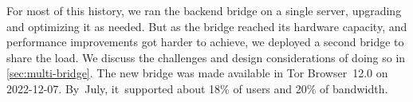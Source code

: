 \documentclass[letterpaper,twocolumn]{article}
\begin{document}
For most of this history,
we ran the backend bridge on a single server,
upgrading and optimizing it as needed.
But as the bridge reached its hardware capacity,
and performance improvements got harder to achieve,
we deployed a second bridge to share the load.
We discuss the challenges and design considerations of doing so in \autoref{sec:multi-bridge}.
The new bridge was made available in
Tor Browser~12.0 on \mbox{2022-12-07}.
By~July, it~supported about
18\% of users and
20\% of bandwidth.
\end{document}
